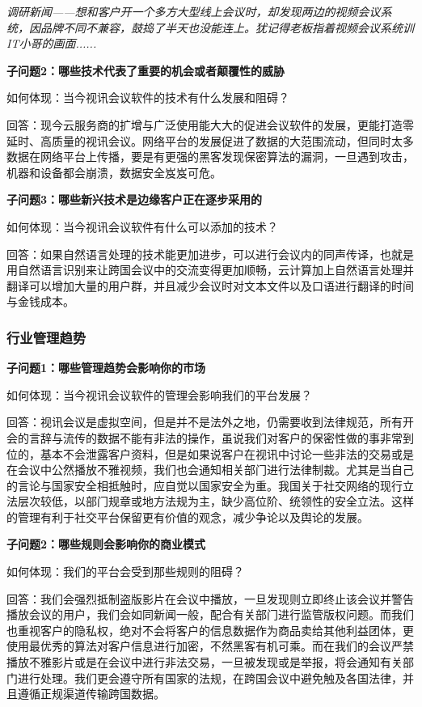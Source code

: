\documentclass[a4paper,12pt]{article}
\begin{document}
    \textit{调研新闻——想和客户开⼀个多⽅⼤型线上会议时，却发现两边的视频会议系统，因品牌不同不兼容，⿎捣了半天也没能连上。犹记得⽼板指着视频会议系统训IT⼩哥的画⾯......}

    \textit{}

    \textbf{子问题2：哪些技术代表了重要的机会或者颠覆性的威胁}

    如何体现：当今视讯会议软件的技术有什么发展和阻碍？

    回答：现今云服务商的扩增与⼴泛使⽤能⼤⼤的促进会议软件的发展，更能打造零延时、⾼质量的视讯会议。⽹络平台的发展促进了数据的⼤范围流动，但同时太多数据在⽹络平台上传播，要是有更强的⿊客发现保密算法的漏洞，⼀旦遇到攻击，机器和设备都会崩溃，数据安全岌岌可危。

    \textbf{子问题3：哪些新兴技术是边缘客户正在逐步采用的}

    如何体现：当今视讯会议软件有什么可以添加的技术？

    回答：如果⾃然语⾔处理的技术能更加进步，可以进⾏会议内的同声传译，也就是⽤⾃然语⾔识别来让跨国会议中的交流变得更加顺畅，云计算加上⾃然语⾔处理并翻译可以增加⼤量的⽤户群，并且减少会议时对⽂本⽂件以及⼝语进⾏翻译的时间与⾦钱成本。

    \subsubsection{行业管理趋势}
    \textbf{子问题1：哪些管理趋势会影响你的市场}

    如何体现：当今视讯会议软件的管理会影响我们的平台发展？

    回答：视讯会议是虚拟空间，但是并不是法外之地，仍需要收到法律规范，所有开会的⾔辞与流传的数据不能有⾮法的操作，虽说我们对客户的保密性做的事⾮常到位的，基本不会泄露客户资料，但是如果说客户在视讯中讨论⼀些⾮法的交易或是在会议中公然播放不雅视频，我们也会通知相关部⻔进⾏法律制裁。尤其是当⾃⼰的⾔论与国家安全相抵触时，应⾃觉以国家安全为重。我国关于社交⽹络的现⾏⽴法层次较低，以部⻔规章或地⽅法规为主，缺少⾼位阶、统领性的安全⽴法。这样的管理有利于社交平台保留更有价值的观念，减少争论以及舆论的发展。
    
    \textbf{子问题2：哪些规则会影响你的商业模式}

    如何体现：我们的平台会受到那些规则的阻碍？

    回答：我们会强烈抵制盗版影⽚在会议中播放，⼀旦发现则⽴即终⽌该会议并警告播放会议的⽤户，我们会如同新闻⼀般，配合有关部⻔进⾏监管版权问题。⽽我们也重视客户的隐私权，绝对不会将客户的信息数据作为商品卖给其他利益团体，更使⽤最优秀的算法对客户信息进⾏加密，不然⿊客有机可乘。⽽在我们的会议严禁播放不雅影⽚或是在会议中进⾏⾮法交易，⼀旦被发现或是举报，将会通知有关部门进⾏处理。我们更会遵守所有国家的法规，在跨国会议中避免触及各国法律，并且遵循正规渠道传输跨国数据。
\end{document}
